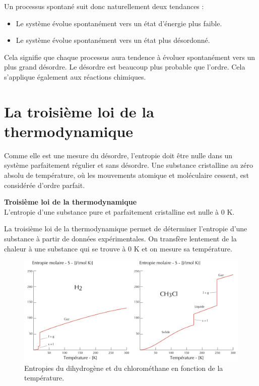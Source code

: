 \documentclass[
  11pt,
  a4paper,
  openany]{book}
\providecommand{\tightlist}{%
  \setlength{\itemsep}{0pt}\setlength{\parskip}{0pt}}
\begin{document}
Un processus spontané suit donc naturellement deux tendances :

\begin{itemize}
\tightlist
\item
  Le système évolue spontanément vers un état d'énergie plus faible.
\item
  Le système évolue spontanément vers un état plus désordonné.
\end{itemize}

Cela signifie que chaque processus aura tendence à évoluer spontanément vers un plus grand désordre. Le désordre est beaucoup plus probable que l'ordre. Cela s'applique également aux réactions chimiques.

\hypertarget{la-troisiuxe8me-loi-de-la-thermodynamique}{%
\section{La troisième loi de la thermodynamique}\label{la-troisiuxe8me-loi-de-la-thermodynamique}}

Comme elle est une mesure du désordre, l'entropie doit être nulle dans un système parfaitement régulier et sans désordre. Une substance cristalline au zéro absolu de température, où les mouvements atomique et moléculaire cessent, est considérée d'ordre parfait.

\begin{tcolorbox}
\textbf{Troisième loi de la thermodynamique}\\
L'entropie d'une substance pure et parfaitement cristalline est nulle à 0 K.

\end{tcolorbox}

La troisième loi de la thermodynamique permet de déterminer l'entropie d'une substance à partir de données expérimentales. On transfère lentement de la chaleur à une substance qui se trouve à 0 K et on mesure sa température.

\begin{figure}

{\centering \includegraphics[width=0.9\linewidth]{images/entropie-graph} 

}

\caption{Entropies du dihydrogène et du chlorométhane en fonction de la température.}\label{fig:entropie-graph}
\end{figure}
\end{document}

